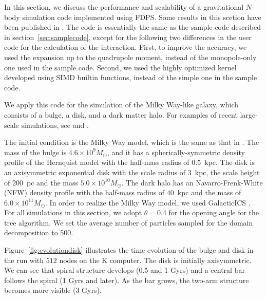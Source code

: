 In this section, we discuss the performance and scalability of a
gravitational $N$-body simulation code implemented using FDPS. Some
results in this scetion have been published in \citet{2015FDPS}. The
code is essentially the same as the sample code described in
section~\ref{sec:samplecode}, except for the following two differences
in the user code for the calculation of the interaction. First, to
improve the accuracy, we used the expansion up to the quadrupole
moment, instead of the monopole-only one used in the sample
code. Second, we used the highly optimized kernel developed using SIMD
builtin functions, instead of the simple one in the sample code.

We apply this code for the simulation of the Milky Way-like galaxy,
which consists of a bulge, a disk, and a dark matter halo. For
examples of recent large-scale simulations,
see \citet{2011ApJ...730..109F}
and \citet{Bedorf:2014:PGT:2683593.2683600}.

The initial condition is the Milky Way model, which is the same as
that in \citet{Bedorf:2014:PGT:2683593.2683600}. The mass of the bulge
is $4.6 \times 10^9 M_\odot$, and it has a spherically-symmetric
density profile of the Hernquist model \citep{1990ApJ...356..359H}
with the half-mass radius of $0.5$~kpc. The disk is an axisymmetric
exponential disk with the scale radius of $3$~kpc, the scale height of
$200$~pc and the mass $5.0 \times 10^{10}M_\odot$. The dark halo has
an Navarro-Frenk-White (NFW) density
profile \citep{1996ApJ...462..563N} with the half-mass radius of
$40$~kpc and the mass of $6.0 \times 10^{11} M_\odot$. In order to
realize the Milky Way model, we used
GalacticICS \citep{2005ApJ...631..838W}. For all simulations in this
section, we adopt $\theta=0.4$ for the opening angle for the tree
algorithm. We set the average number of particles sampled for the
domain decomposition to 500.


Figure~\ref{fig:evolutiondisk} illustrates the time evolution of the
bulge and disk in the run with $512$ nodes on the K computer. The disk
is initially axisymmetric. We can see that spiral structure develops
(0.5 and 1 Gyrs) and a central bar follows the spiral (1 Gyrs and
later). As the bar grows, the two-arm structure becomes more visible
(3 Gyrs).

